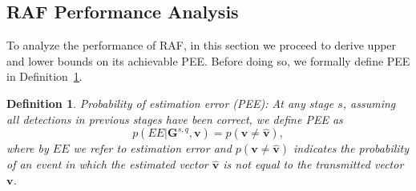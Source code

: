 \documentclass{ieeeaccess}
\newtheorem{defn}{Definition}
\begin{document}
\subsection{RAF Performance Analysis}
To analyze the performance of RAF, in this section we proceed to derive upper and lower bounds on its achievable PEE. Before doing so, we formally define PEE in Definition~\ref{def7}.

\begin{defn}\label{def7}
	\textit{Probability of estimation error (PEE):} At any stage $s$, assuming all detections in previous stages have been correct, we define PEE as
    \begin{equation} \label{ff1}
    p(EE|\boldsymbol{G}^{s,q},\boldsymbol{v})= p(\boldsymbol{v}\neq \boldsymbol{\hat{v}}),
    \end{equation}
    where by $EE$ we refer to estimation error and $p(\boldsymbol{v}\neq \boldsymbol{\hat{v}})$ indicates the probability of an event in which the estimated vector $\boldsymbol{\hat{v}}$ is not equal to the transmitted vector $\boldsymbol{v}$.
\end{defn}
\end{document}
